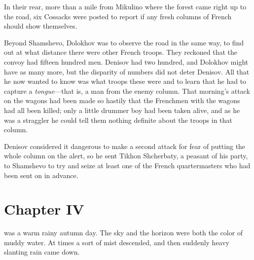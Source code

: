 In their rear, more than a mile from Mikulino where the forest
came right up to the road, six Cossacks were posted to report if
any fresh columns of French should show themselves.

Beyond Shamshevo, Dolokhov was to observe the road in the same
way, to find out at what distance there were other French
troops. They reckoned that the convoy had fifteen hundred
men. Denisov had two hundred, and Dolokhov might have as many
more, but the disparity of numbers did not deter Denisov. All
that he now wanted to know was what troops these were and to
learn that he had to capture a \emph{tongue}---that is, a man
from the enemy column. That morning's attack on the wagons had
been made so hastily that the Frenchmen with the wagons had all
been killed; only a little drummer boy had been taken alive, and
as he was a straggler he could tell them nothing definite about
the troops in that column.

Denisov considered it dangerous to make a second attack for fear
of putting the whole column on the alert, so he sent Tikhon
Shcherbaty, a peasant of his party, to Shamshevo to try and seize
at least one of the French quartermasters who had been sent on in
advance.


\chapter*{Chapter IV} \ifaudio {}
\fi

 was a warm rainy autumn day. The sky and the horizon were both
the color of muddy water. At times a sort of mist descended, and
then suddenly heavy slanting rain came down.

